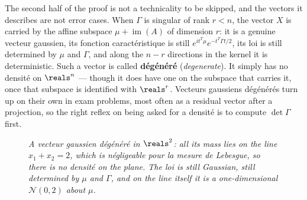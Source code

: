 The second half of the proof is not a technicality to be skipped, and the vectors
it describes are not error cases. When $\Gamma$ is singular of rank $r < n$, the
vector $X$ is carried by the affine subspace $\mu + \operatorname{im}(A)$ of
dimension $r$: it is a genuine vecteur gaussien, its fonction caractéristique is
still $e^{it^{T}\mu}e^{-t^{T}\Gamma t/2}$, its loi is still determined by
$\mu$ and $\Gamma$, and along the $n-r$ directions in the kernel it is deterministic.
Such a vector is called \textbf{dégénéré} (\textit{degenerate}). It simply has no
densité on $\reals^{n}$ --- though it does have one on the subspace that carries
it, once that subspace is identified with $\reals^{r}$. Vecteurs gaussiens
dégénérés turn up on their own in exam problems, most often as a residual vector
after a projection, so the right reflex on being asked for a densité is to
compute $\det\Gamma$ first.

\begin{figure}[ht]
\centering
{}

{\centering \small \textit{A vecteur gaussien dégénéré in $\reals^{2}$: all its
mass lies on the line $x_{1} + x_{2} = 2$, which is négligeable pour la mesure de
Lebesgue, so there is no densité on the plane. The loi is still Gaussian, still
determined by $\mu$ and $\Gamma$, and on the line itself it is a one-dimensional
$\mathcal{N}(0,2)$ about $\mu$.}\par}
\end{figure}

